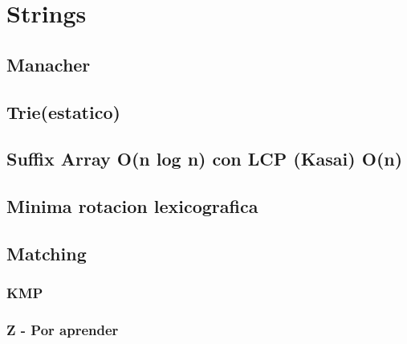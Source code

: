 

\section{Strings}%
\subsection{Manacher}

\subsection{Trie(estatico)}

\subsection{Suffix Array O(n log n) con LCP (Kasai) O(n)}

\subsection{Minima rotacion lexicografica}

\subsection{Matching}
\subsubsection{KMP}

\subsubsection{Z - Por aprender}

